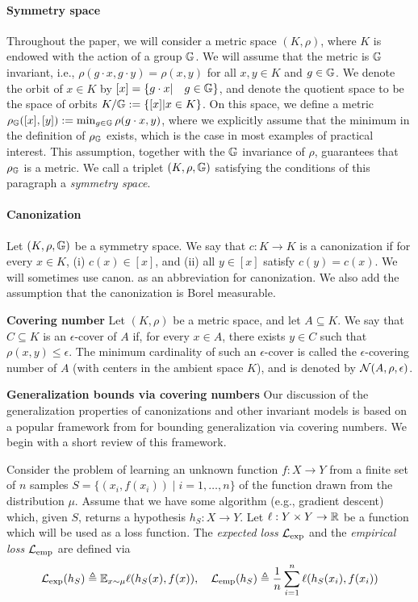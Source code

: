 \paragraph{Symmetry space} Throughout the paper, we will consider a metric space $(K,\rho) $, where $K$ is endowed with the action of a group $\mathbb{G}$. We will assume that the metric is $\mathbb{G}$ invariant, i.e., $ \rho(g\cdot x, g \cdot y)=\rho(x,y)$ for all $x,y\in K$ and $g \in \mathbb{G} $. We denote the orbit of $x\in K$ by  $[x]=\{g\cdot x| \quad g\in \mathbb{G} \}$, and denote the quotient space to be the space of orbits $K/\mathbb{G}:=\{[x]|x \in K\}$. On this space, we define a metric $\rho_{\mathbb{G}}([x],[y]):=\min_{g \in \mathbb{G}}\rho(g\cdot x,y)$, where we explicitly assume that the minimum in the definition of $\rho_{\mathbb{G}}$  exists, which is the case in most examples of practical interest. This assumption, together with the $\mathbb{G}$ invariance of $\rho$, guarantees that $\rho_{\mathbb{G}}$ is a metric. We call a triplet $(K,\rho,\mathbb{G})$ satisfying the conditions of this paragraph a \emph{symmetry space}.

\paragraph{Canonization} Let $(K,\rho,\mathbb{G}) $ be a symmetry space. We say that $c:K \rightarrow K$ is a canonization if for every $x\in K$, (i) $c(x)\in [x]$, and (ii) all  $y\in [x]$ satisfy $c(y)=c(x) $. We will sometimes use canon. as an abbreviation for canonization. We also add the assumption that the canonization is Borel measurable.


\textbf{Covering number}
Let $(K,\rho)$ be a metric space, and let $A\subseteq K$. We say that $C\subseteq K$ is an $\epsilon$-cover of $A$ if, for every $x\in A$, there exists $y\in C$ such that $\rho(x,y)\leq\epsilon$. The minimum cardinality of such an $\epsilon$-cover is called the $\epsilon$-covering number of $A$ (with centers in the ambient space $K$), and is denoted by $\mathcal{N}(A,\rho,\epsilon)$.

\textbf{Generalization bounds via covering numbers}
Our discussion of the generalization properties of canonizations and other invariant models is based on a popular framework from \cite{xu_robustness_2012} for bounding generalization via covering numbers. We begin with a short review of this framework.

Consider the problem of learning an unknown function $f:X\to Y $ from a finite set of $n$ samples $S=\{(x_i,f(x_i)) \mid i=1,\ldots,n \}$ of the function drawn from the distribution $\mu$. Assume that we have some algorithm (e.g., gradient descent) which, given $S$, returns a hypothesis $h_S:X \to Y $. Let $\ell:Y \times Y \to \mathbb{R}  $ be a function which will be used as a loss function. The \emph{expected loss} $\mathcal{L}_{\mathrm{exp}}$ and the \emph{empirical loss} $\mathcal{L}_{\mathrm{emp}} $ are defined via
$$\mathcal{L}_{\mathrm{exp}}(h_S) \triangleq \mathbb{E}_{x \sim \mu} \ell(h_S(x),f(x)), \quad \mathcal{L}_{\mathrm{emp}}(h_S)\triangleq\frac{1}{n}\sum_{i=1}^n \ell(h_S(x_i),f(x_i))$$


